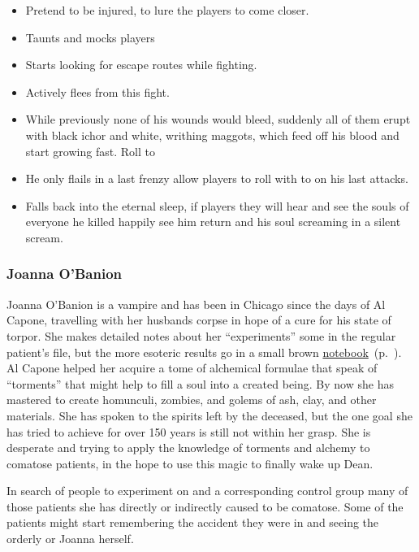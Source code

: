 \begin{itemize}[noitemsep]
  \item Pretend to be injured, to lure the players to come closer.
  \item Taunts and mocks players
  \item Starts looking for escape routes while fighting.
  \item Actively flees from this fight.
  \item While previously none of his wounds would bleed, suddenly all of them erupt with black ichor and white,
    writhing maggots, which feed off his blood and start growing fast.  Roll to 
  \item He only flails in a last frenzy allow players to roll with  to  on
    his last attacks.
  \item[\KULTgold{\skull}] Falls back into the eternal sleep, if players  they will
        hear and see the souls of everyone he killed happily see him return and his soul screaming in a silent scream.
\end{itemize}

\subsubsection{Joanna O'Banion}%
\label{ssub:joanna_o_banion}

Joanna O'Banion is a vampire and has been in Chicago since the days of Al Capone, travelling with her husbands corpse in hope
of a cure for his state of torpor.  She makes detailed notes about her “experiments” some in the regular patient's file, but
the more esoteric results go in a small brown \hyperref[notebook]{notebook}~(p.~\pageref{notebook}).  Al Capone helped her
acquire a tome of alchemical formulae that speak of “torments” that might help to fill a soul into a created being.  By now she
has mastered to create homunculi, zombies, and golems of ash, clay, and other materials.  She has spoken to the spirits left by
the deceased, but the one goal she has tried to achieve for over 150 years is still not within her grasp.  She is desperate and
trying to apply the knowledge of torments and alchemy to comatose patients, in the hope to use this magic to finally wake up
Dean.

In search of people to experiment on and a corresponding control group many of those patients she has directly or indirectly
caused to be comatose.  Some of the patients might start remembering the accident they were in and seeing the orderly or Joanna
herself.

